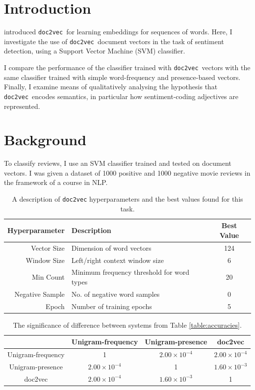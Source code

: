 \documentclass[12pt]{article}
\newcommand{\docvec}{\texttt{doc2vec}}
\begin{document}
\begin{multicols}{2}

\section{Introduction}

\citet{le2014distributed} introduced \docvec~for learning embeddings for sequences of words. Here, I investigate the use of \docvec~document vectors in the task of sentiment detection, using a Support Vector Machine (SVM) classifier.

I compare the performance of the classifier trained with \docvec~vectors with the same classifier trained with simple word-frequency and presence-based vectors. Finally, I examine means of qualitatively analysing the hypothesis that \docvec~encodes semantics, in particular how sentiment-coding adjectives are represented.

\section{Background}

To classify reviews, I use an SVM classifier trained and tested on document vectors. I was given a dataset of 1000 positive and 1000 negative movie reviews in the framework of a course in NLP.

\begin{table}[t]
\centering
 \begin{tabular}{ r l c}
 \bf{Hyperparameter} & \bf{Description} & \bf{Best Value} \\ [0.5ex] 
 \hline
Vector Size &  Dimension of word vectors & 124 \\ 
Window Size & Left/right context window size & 6 \\
Min Count & Minimum frequency threshold for word types & 20 \\
Negative Sample & No. of negative word samples & 0 \\
Epoch & Number of training epochs & 5 \\
\end{tabular}
\caption{A description of \texttt{doc2vec} hyperparameters and the best values found for this task.} \label{table:params}
\end{table}

\begin{table}[t]
\centering
 \begin{tabular}{|c|c|c|c|} 
 \hline
  & Unigram-frequency & Unigram-presence & doc2vec \\ [0.5ex] 
 \hline\hline
Unigram-frequency & 1 &  $2.00\times 10^{-4}$ & $2.00\times 10^{-4}$\\
 \hline
Unigram-presence & $2.00\times 10^{-4}$ & 1  & $1.60\times 10^{-3}$\\
 \hline
doc2vec & $2.00\times 10^{-4}$ & $1.60\times 10^{-3}$ & 1 \\
 \hline
\end{tabular}
\caption{The significance of difference between systems from Table \ref{table:accuracies}.} \label{table:p-values}
\end{table}


\end{multicols}
\end{document}
